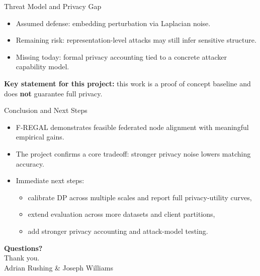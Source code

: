 \documentclass[11pt, aspectratio=169]{beamer}
\begin{document}
\begin{frame}{Threat Model and Privacy Gap}
    \begin{itemize}
        \item Assumed defense: embedding perturbation via Laplacian noise.
        \item Remaining risk: representation-level attacks may still infer sensitive structure.
        \item Missing today: formal privacy accounting tied to a concrete attacker capability model.
    \end{itemize}
    \vspace{0.25cm}
    \textbf{Key statement for this project:} this work is a proof of concept baseline and does \textbf{not} guarantee full privacy.
\end{frame}

\begin{frame}{Conclusion and Next Steps}
    \begin{itemize}
        \item F-REGAL demonstrates feasible federated node alignment with meaningful empirical gains.
        \item The project confirms a core tradeoff: stronger privacy noise lowers matching accuracy.
        \item Immediate next steps:
        \begin{itemize}
            \item calibrate DP across multiple scales and report full privacy-utility curves,
            \item extend evaluation across more datasets and client partitions,
            \item add stronger privacy accounting and attack-model testing.
        \end{itemize}
    \end{itemize}
\end{frame}

\begin{frame}
    \vspace{2cm}
    \begin{center}
        \Huge{\textbf{Questions?}} \\
        \vspace{1cm}
        \Large{Thank you.} \\
        \vspace{1.2cm}
        \normalsize{Adrian Rushing \& Joseph Williams}
    \end{center}
\end{frame}
\end{document}
